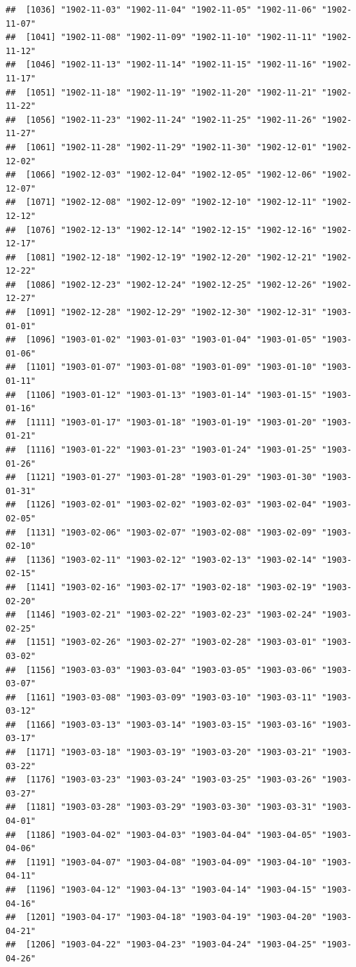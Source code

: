 \documentclass{article}\usepackage[]{graphicx}\usepackage[]{color}
\makeatletter
\newenvironment{kframe}{%
 \def\at@end@of@kframe{}%
 \ifinner\ifhmode%
  \def\at@end@of@kframe{\end{minipage}}%
  \begin{minipage}{\columnwidth}%
 \fi\fi%
 \def\FrameCommand##1{\hskip\@totalleftmargin \hskip-\fboxsep
 \colorbox{shadecolor}{##1}\hskip-\fboxsep
     \hskip-\linewidth \hskip-\@totalleftmargin \hskip\columnwidth}%
 \MakeFramed {\advance\hsize-\width
   \@totalleftmargin\z@ \linewidth\hsize
   \@setminipage}}%
 {\par\unskip\endMakeFramed%
 \at@end@of@kframe}
\newenvironment{knitrout}{}{} %
\makeatother
\begin{document}
\begin{description}
\begin{knitrout}
\begin{kframe}
\begin{verbatim}
##  [1036] "1902-11-03" "1902-11-04" "1902-11-05" "1902-11-06" "1902-11-07"
##  [1041] "1902-11-08" "1902-11-09" "1902-11-10" "1902-11-11" "1902-11-12"
##  [1046] "1902-11-13" "1902-11-14" "1902-11-15" "1902-11-16" "1902-11-17"
##  [1051] "1902-11-18" "1902-11-19" "1902-11-20" "1902-11-21" "1902-11-22"
##  [1056] "1902-11-23" "1902-11-24" "1902-11-25" "1902-11-26" "1902-11-27"
##  [1061] "1902-11-28" "1902-11-29" "1902-11-30" "1902-12-01" "1902-12-02"
##  [1066] "1902-12-03" "1902-12-04" "1902-12-05" "1902-12-06" "1902-12-07"
##  [1071] "1902-12-08" "1902-12-09" "1902-12-10" "1902-12-11" "1902-12-12"
##  [1076] "1902-12-13" "1902-12-14" "1902-12-15" "1902-12-16" "1902-12-17"
##  [1081] "1902-12-18" "1902-12-19" "1902-12-20" "1902-12-21" "1902-12-22"
##  [1086] "1902-12-23" "1902-12-24" "1902-12-25" "1902-12-26" "1902-12-27"
##  [1091] "1902-12-28" "1902-12-29" "1902-12-30" "1902-12-31" "1903-01-01"
##  [1096] "1903-01-02" "1903-01-03" "1903-01-04" "1903-01-05" "1903-01-06"
##  [1101] "1903-01-07" "1903-01-08" "1903-01-09" "1903-01-10" "1903-01-11"
##  [1106] "1903-01-12" "1903-01-13" "1903-01-14" "1903-01-15" "1903-01-16"
##  [1111] "1903-01-17" "1903-01-18" "1903-01-19" "1903-01-20" "1903-01-21"
##  [1116] "1903-01-22" "1903-01-23" "1903-01-24" "1903-01-25" "1903-01-26"
##  [1121] "1903-01-27" "1903-01-28" "1903-01-29" "1903-01-30" "1903-01-31"
##  [1126] "1903-02-01" "1903-02-02" "1903-02-03" "1903-02-04" "1903-02-05"
##  [1131] "1903-02-06" "1903-02-07" "1903-02-08" "1903-02-09" "1903-02-10"
##  [1136] "1903-02-11" "1903-02-12" "1903-02-13" "1903-02-14" "1903-02-15"
##  [1141] "1903-02-16" "1903-02-17" "1903-02-18" "1903-02-19" "1903-02-20"
##  [1146] "1903-02-21" "1903-02-22" "1903-02-23" "1903-02-24" "1903-02-25"
##  [1151] "1903-02-26" "1903-02-27" "1903-02-28" "1903-03-01" "1903-03-02"
##  [1156] "1903-03-03" "1903-03-04" "1903-03-05" "1903-03-06" "1903-03-07"
##  [1161] "1903-03-08" "1903-03-09" "1903-03-10" "1903-03-11" "1903-03-12"
##  [1166] "1903-03-13" "1903-03-14" "1903-03-15" "1903-03-16" "1903-03-17"
##  [1171] "1903-03-18" "1903-03-19" "1903-03-20" "1903-03-21" "1903-03-22"
##  [1176] "1903-03-23" "1903-03-24" "1903-03-25" "1903-03-26" "1903-03-27"
##  [1181] "1903-03-28" "1903-03-29" "1903-03-30" "1903-03-31" "1903-04-01"
##  [1186] "1903-04-02" "1903-04-03" "1903-04-04" "1903-04-05" "1903-04-06"
##  [1191] "1903-04-07" "1903-04-08" "1903-04-09" "1903-04-10" "1903-04-11"
##  [1196] "1903-04-12" "1903-04-13" "1903-04-14" "1903-04-15" "1903-04-16"
##  [1201] "1903-04-17" "1903-04-18" "1903-04-19" "1903-04-20" "1903-04-21"
##  [1206] "1903-04-22" "1903-04-23" "1903-04-24" "1903-04-25" "1903-04-26"

\end{verbatim}
\end{kframe}
\end{knitrout}
\end{description}
\end{document}

